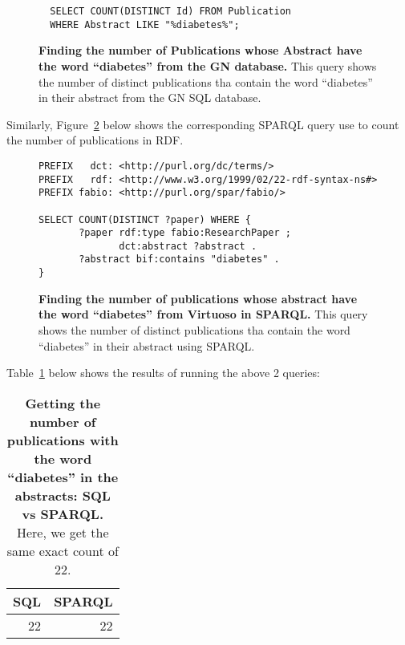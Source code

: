 \begin{figure}[H]
\centering
\begin{verbatim}
  SELECT COUNT(DISTINCT Id) FROM Publication
  WHERE Abstract LIKE "%diabetes%";
\end{verbatim}
\caption[SQL Query to count publications with the word ``diabetes'']{\textbf{Finding the number of Publications whose Abstract have the word ``diabetes'' from the GN database.}  This query shows the number of distinct publications tha contain the word ``diabetes'' in their abstract from the GN SQL database.}\label{sql:counting-pubs-with-diabetes}
\end{figure}

Similarly, Figure~\ref{sparql:counting-pubs-with-diabetes} below shows the corresponding SPARQL query use to count the number of publications in RDF\@.

\begin{figure}[H]
\centering
\begin{verbatim}
PREFIX   dct: <http://purl.org/dc/terms/>
PREFIX   rdf: <http://www.w3.org/1999/02/22-rdf-syntax-ns#>
PREFIX fabio: <http://purl.org/spar/fabio/>

SELECT COUNT(DISTINCT ?paper) WHERE {
       ?paper rdf:type fabio:ResearchPaper ;
              dct:abstract ?abstract .
       ?abstract bif:contains "diabetes" .
}
\end{verbatim}
\caption[SPARQL Query to count publications with the word ``diabetes'']{\textbf{Finding the number of publications whose abstract have the word ``diabetes'' from Virtuoso in SPARQL.}  This query shows the number of distinct publications tha contain the word ``diabetes'' in their abstract using SPARQL.}\label{sparql:counting-pubs-with-diabetes}
\end{figure}


Table~\ref{table:count-diabetes-publications} below shows the results of running the above 2 queries:

\begin{table}[H]
\begin{tabular}{rr}
SQL & SPARQL \\[0pt]
\toprule
22 & 22\\[0pt]
\end{tabular}
\caption[Comparison of publication count with "diabetes" in abstracts: SQL vs SPARQL.]{\textbf{Getting the number of publications with the word ``diabetes'' in the abstracts: SQL vs SPARQL.}  Here, we get the same exact count of 22.}\label{table:count-diabetes-publications}
\end{table}

